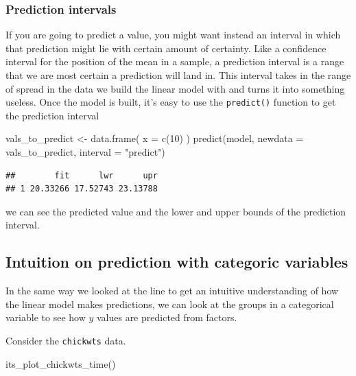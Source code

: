 \documentclass[
]{book}
\newenvironment{Shaded}{\begin{snugshade}}{\end{snugshade}}
\newcommand{\AttributeTok}[1]{\textcolor[rgb]{0.77,0.63,0.00}{#1}}
\newcommand{\DecValTok}[1]{\textcolor[rgb]{0.00,0.00,0.81}{#1}}
\newcommand{\FunctionTok}[1]{\textcolor[rgb]{0.00,0.00,0.00}{#1}}
\newcommand{\NormalTok}[1]{#1}
\newcommand{\OtherTok}[1]{\textcolor[rgb]{0.56,0.35,0.01}{#1}}
\newcommand{\StringTok}[1]{\textcolor[rgb]{0.31,0.60,0.02}{#1}}
\begin{document}
\hypertarget{prediction-intervals}{%
\subsubsection{Prediction intervals}\label{prediction-intervals}}

If you are going to predict a value, you might want instead an interval in which that prediction might lie with certain amount of certainty. Like a confidence interval for the position of the mean in a sample, a prediction interval is a range that we are most certain a prediction will land in. This interval takes in the range of spread in the data we build the linear model with and turns it into something useless. Once the model is built, it's easy to use the \texttt{predict()} function to get the prediction interval

\begin{Shaded}
\begin{Highlighting}[]
\NormalTok{vals\_to\_predict }\OtherTok{\textless{}{-}} \FunctionTok{data.frame}\NormalTok{( }\AttributeTok{x =} \FunctionTok{c}\NormalTok{(}\DecValTok{10}\NormalTok{) )}
\FunctionTok{predict}\NormalTok{(model, }\AttributeTok{newdata =}\NormalTok{ vals\_to\_predict, }\AttributeTok{interval =} \StringTok{"predict"}\NormalTok{)}
\end{Highlighting}
\end{Shaded}

\begin{verbatim}
##        fit      lwr      upr
## 1 20.33266 17.52743 23.13788
\end{verbatim}

we can see the predicted value and the lower and upper bounds of the prediction interval.

\hypertarget{intuition-on-prediction-with-categoric-variables}{%
\subsection{Intuition on prediction with categoric variables}\label{intuition-on-prediction-with-categoric-variables}}

In the same way we looked at the line to get an intuitive understanding of how the linear model makes predictions, we can look at the groups in a categorical variable to see how \(y\) values are predicted from factors.

Consider the \texttt{chickwts} data.

\begin{Shaded}
\begin{Highlighting}[]
\FunctionTok{its\_plot\_chickwts\_time}\NormalTok{()}
\end{Highlighting}
\end{Shaded}
\end{document}

